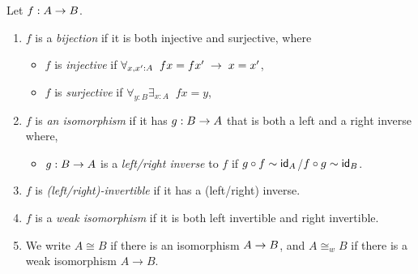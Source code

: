 \begin{defn} \label{defn:isos}
Let $f:A\ra B$.
\begin{enumerate}
\item $f$ is a {\em bijection} if it is both injective and surjective, where
\begin{itemize}
\item $f$ is {\em injective} if $\forall_{x,x':A}\; \; fx=fx'\;\ra\; x=x'$,
\item $f$ is {\em surjective} if $\forall_{y:B}\exists_{x:A}\;\; fx=y$,
\end{itemize}
\item $f$ is {\em an isomorphism} if it has $g:B\ra A$ that is both a left and a right
inverse where,
\begin{itemize} \item $g:B\ra A$ is a {\em left/right inverse} to $f$ if 
$g\circ f\sim \idfunc[A]$/$f\circ g\sim \idfunc[B]$.
\end{itemize}
\item $f$ is {\em (left/right)-invertible} if it has a (left/right) inverse.
\item $f$ is a {\em weak isomorphism} if it is both left invertible and right invertible.
\item We write $A\cong B$ if there is an isomorphism $A\ra B$, and $A\cong_w B$ if there is a weak isomorphism $A\to B$.
\end{enumerate}
\end{defn}


